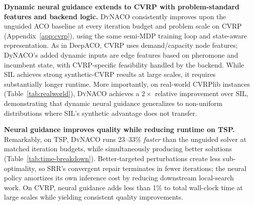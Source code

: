 \documentclass[sigconf]{acmart}
\newcommand{\DyNACO}{\textsc{DyNACO}}
\begin{document}
\smallskip\noindent\textbf{Dynamic neural guidance extends to CVRP with problem-standard features and backend logic.}
\DyNACO{} consistently improves upon the unguided ACO baseline at every iteration budget and problem scale on CVRP (Appendix~\ref{app:cvrp}), using the same semi-MDP training loop and state-aware representation. As in DeepACO, CVRP uses demand/capacity node features; DyNACO's added dynamic inputs are edge features based on pheromone and incumbent state, with CVRP-specific feasibility handled by the backend.
While SIL achieves strong synthetic-CVRP results at large scales, it requires substantially longer runtime.
More importantly, on real-world CVRPlib instances (Table~\ref{tab:realworld}), \DyNACO{} achieves a $2{\times}$ relative improvement over SIL, demonstrating that dynamic neural guidance generalizes to non-uniform distributions where SIL's synthetic advantage does not transfer.

\smallskip\noindent\textbf{Neural guidance improves quality while reducing runtime on TSP.}
Remarkably, on TSP, \DyNACO{} runs 23--33\% \emph{faster} than the unguided solver at matched iteration budgets, while simultaneously producing better solutions (Table~\ref{tab:time-breakdown}).
Better-targeted perturbations create less sub-optimality, so SRR's convergent repair terminates in fewer iterations; the neural policy amortizes its own inference cost by reducing downstream local-search work.
On CVRP, neural guidance adds less than 1\% to total wall-clock time at large scales while yielding consistent quality improvements.
\end{document}
